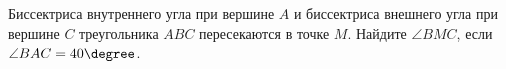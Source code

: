 \begin{ex}
	\begin{condition}
		Биссектриса внутреннего угла при вершине \( A  \) и биссектриса внешнего угла при вершине \( C  \) треугольника \( ABC  \) пересекаются в точке \( M  \). Найдите \( \angle BMC \), если \( \angle BAC = 40\degree\).
	\end{condition}
	\answer{\( 70\degree \)}
\end{ex}